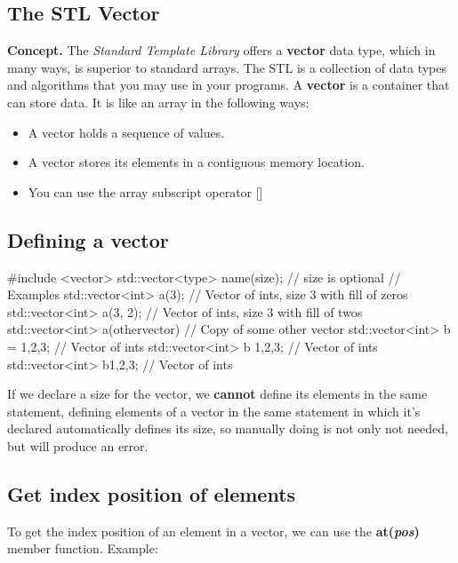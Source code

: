 \documentclass{report}
\begin{document}
    \pagebreak
    \subsection{The STL Vector}
    \bigbreak \noindent 
    \textbf{Concept. } The \textit{Standard Template Library} offers a \textbf{vector} data type, which in many ways, is superior to standard arrays.
    \bigbreak \noindent 
    The STL is a collection of data types and algorithms that you may use in your programs. 
    \bigbreak \noindent 
    A \textbf{vector} is a container that can store data. It is like an array in the following ways:
    \begin{itemize}
        \item A vector holds a sequence of values.
        \item A vector stores its elements in a contiguous memory location.
        \item You can use the array subscript operator []
    \end{itemize}

    \bigbreak \noindent 
    \subsection{Defining a vector}
    \bigbreak \noindent 
    
    \begin{cppcode}
#include <vector>
std::vector<type> name(size); // size is optional 
// Examples
std::vector<int> a(3); // Vector of ints, size 3 with fill of zeros
std::vector<int> a(3, 2); // Vector of ints, size 3 with fill of twos
std::vector<int> a(othervector) // Copy of some other vector
std::vector<int> b = {1,2,3}; // Vector of ints
std::vector<int> b {1,2,3}; // Vector of ints
std::vector<int> b{1,2,3}; // Vector of ints
    \end{cppcode}
    
    \bigbreak \noindent 
    \begin{notebox}
        If we declare a size for the vector, we \textbf{cannot} define its elements in the same statement, defining elements of a vector in the same statement in which it's declared automatically defines its size, so manually doing is not only not needed, but will produce an error.
    \end{notebox}

    \bigbreak \noindent 
    \subsection{Get index position of elements}
    \bigbreak \noindent 
    To get the index position of an element in a vector, we can use the \textbf{at(\textit{pos})} member function.
    \bigbreak \noindent 
    Example:
    \bigbreak \noindent 
    
\end{document}
